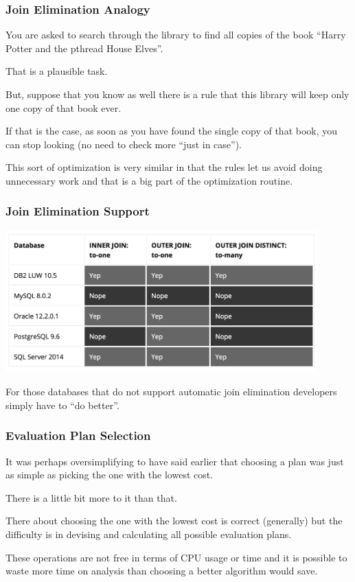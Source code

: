 \begin{frame}
\frametitle{Join Elimination Analogy}
You are asked to search through the library to find all copies of the book ``Harry Potter and the pthread House Elves''. 

That is a plausible task. 

But, suppose that you know as well there is a rule that this library will keep only one copy of that book ever. 

If that is the case, as soon as you have found the single copy of that book, you can stop looking (no need to check more ``just in case''). 

This sort of optimization is very similar in that the rules let us avoid doing unnecessary work and that is a big part of the optimization routine.

\end{frame}


\begin{frame}
\frametitle{Join Elimination Support}

\begin{center}
	\includegraphics[width=0.9\textwidth]{images/joinelim-support}
\end{center}

For those databases that do not support automatic join elimination developers simply have to ``do better''. 

\end{frame}


\begin{frame}
\frametitle{Evaluation Plan Selection}

It was perhaps oversimplifying to have said earlier that choosing a plan was just as simple as picking the one with the lowest cost. 

There is a little bit more to it than that.

There about choosing the one with the lowest cost is correct (generally) but the difficulty is in devising and calculating all possible evaluation plans. 

These operations are not free in terms of CPU usage or time and it is possible to waste more time on analysis than choosing a better algorithm would save. 

\end{frame}


